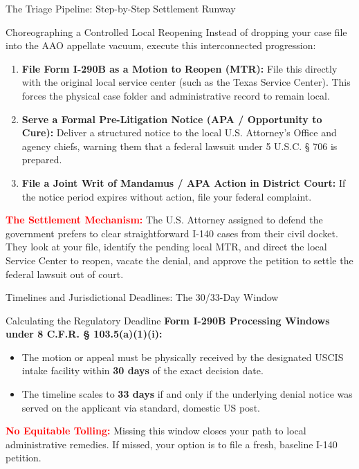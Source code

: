 \documentclass[11pt]{beamer}
\begin{document}
	\begin{frame}{The Triage Pipeline: Step-by-Step Settlement Runway}
		\scriptsize
		\begin{block}{Choreographing a Controlled Local Reopening}
			Instead of dropping your case file into the AAO appellate vacuum, execute this interconnected progression:
			\vspace{0.15cm}
			\begin{enumerate}
				\item \textbf{File Form I-290B as a Motion to Reopen (MTR):} File this directly with the original local service center (such as the Texas Service Center). This forces the physical case folder and administrative record to remain local.
				\item \textbf{Serve a Formal Pre-Litigation Notice (APA / Opportunity to Cure):} Deliver a structured notice to the local U.S. Attorney's Office and agency chiefs, warning them that a federal lawsuit under 5 U.S.C. § 706 is prepared.
				\item \textbf{File a Joint Writ of Mandamus / APA Action in District Court:} If the notice period expires without action, file your federal complaint.
			\end{enumerate}
			\vspace{0.15cm}
			\textcolor{red}{\textbf{The Settlement Mechanism:}} The U.S. Attorney assigned to defend the government prefers to clear straightforward I-140 cases from their civil docket. They look at your file, identify the pending local MTR, and direct the local Service Center to reopen, vacate the denial, and approve the petition to settle the federal lawsuit out of court.
		\end{block}
	\end{frame}
	
	\begin{frame}{Timelines and Jurisdictional Deadlines: The 30/33-Day Window}
		\scriptsize
		\begin{block}{Calculating the Regulatory Deadline}
			\textbf{Form I-290B Processing Windows under 8 C.F.R. § 103.5(a)(1)(i):}
			\begin{itemize}
				\item The motion or appeal must be physically received by the designated USCIS intake facility within \textbf{30 days} of the exact decision date.
				\item The timeline scales to \textbf{33 days} if and only if the underlying denial notice was served on the applicant via standard, domestic US post.
			\end{itemize}
			\textcolor{red}{\textbf{No Equitable Tolling:}} Missing this window closes your path to local administrative remedies. If missed, your option is to file a fresh, baseline I-140 petition.
		\end{block}
	\end{frame}
	
\end{document}
